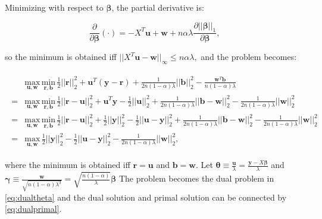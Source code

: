 Minimizing with respect to $\boldsymbol\beta$, the partial derivative is:

\begin{equation}
    \label{eq:partialbeta}
    \frac{\partial}{\partial\boldsymbol\beta}(\cdot) =-X^T\boldsymbol u+\boldsymbol w+n\alpha\lambda\frac{\partial||\boldsymbol\beta||_1}{\partial\boldsymbol\beta},
\end{equation}

so the minimum is obtained iff $||X^T\boldsymbol u-\boldsymbol w||_\infty\leq n\alpha\lambda,$ and the problem becomes:

\begin{gather}
    \label{eq:dualuw}
    \begin{aligned}
        &\underset{\boldsymbol u,\boldsymbol w}{\mathrm{max}}\,\underset{\boldsymbol r,\boldsymbol b}{\mathrm{min}}\,\frac{1}{2}||\boldsymbol r||_2^2+\boldsymbol u^T(\boldsymbol y-\boldsymbol r)+\frac{1}{2n(1-\alpha)\lambda}||\boldsymbol b||_2^2-\frac{\boldsymbol w^T\boldsymbol b}{n(1-\alpha)\lambda}\\
        =&\underset{\boldsymbol u,\boldsymbol w}{\mathrm{max}}\,\underset{\boldsymbol r,\boldsymbol b}{\mathrm{min}}\,\frac{1}{2}||\boldsymbol r-\boldsymbol u||_2^2+\boldsymbol u^T\boldsymbol y-\frac{1}{2}||\boldsymbol u||_2^2+\frac{1}{2n(1-\alpha)\lambda}||\boldsymbol b-\boldsymbol w||_2^2-\frac{1}{2n(1-\alpha)\lambda}||\boldsymbol w||_2^2\\
        =&\underset{\boldsymbol u,\boldsymbol w}{\mathrm{max}}\,\underset{\boldsymbol r,\boldsymbol b}{\mathrm{min}}\,\frac{1}{2}||\boldsymbol r-\boldsymbol u||_2^2+\frac{1}{2}||\boldsymbol y||_2^2-\frac{1}{2}||\boldsymbol u-\boldsymbol y||_2^2+\frac{1}{2n(1-\alpha)\lambda}||\boldsymbol b-\boldsymbol w||_2^2-\frac{1}{2n(1-\alpha)\lambda}||\boldsymbol w||_2^2\\
        =&\underset{\boldsymbol u,\boldsymbol w}{\mathrm{max}}\,\frac{1}{2}||\boldsymbol y||_2^2-\frac{1}{2}||\boldsymbol u-\boldsymbol y||_2^2-\frac{1}{2n(1-\alpha)\lambda}||\boldsymbol w||_2^2,
    \end{aligned}
\end{gather}

where the minimum is obtained iff $\boldsymbol r=\boldsymbol u$ and $\boldsymbol b=\boldsymbol w$. Let $\boldsymbol\theta\equiv\frac{\boldsymbol u}{\lambda}=\frac{\boldsymbol y-X\boldsymbol\beta}{\lambda}$ and $\boldsymbol\gamma\equiv\frac{\boldsymbol w}{\sqrt{n(1-\alpha)\lambda^3}}=\sqrt{\frac{n(1-\alpha)}{\lambda}}\boldsymbol\beta$ The problem becomes the dual problem in \eqref{eq:dualtheta} and the dual solution and primal solution can be connected by \eqref{eq:dualprimal}.

